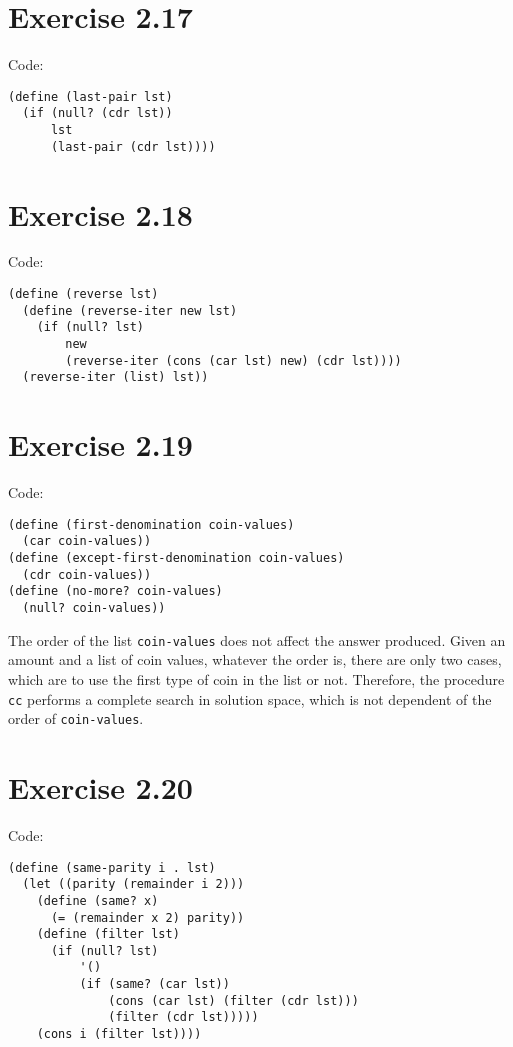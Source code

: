 \documentclass[../main.tex]{subfiles}
\begin{document}
\section{Exercise 2.17}

Code:

\begin{lstlisting}
(define (last-pair lst)
  (if (null? (cdr lst))
      lst
      (last-pair (cdr lst))))
\end{lstlisting}

\section{Exercise 2.18}

Code:

\begin{lstlisting}
(define (reverse lst)
  (define (reverse-iter new lst)
    (if (null? lst)
        new
        (reverse-iter (cons (car lst) new) (cdr lst))))
  (reverse-iter (list) lst))
\end{lstlisting}

\section{Exercise 2.19}

Code:

\begin{lstlisting}
(define (first-denomination coin-values)
  (car coin-values))
(define (except-first-denomination coin-values)
  (cdr coin-values))
(define (no-more? coin-values)
  (null? coin-values))
\end{lstlisting}

The order of the list \lstinline{coin-values} does not
 affect the answer produced. Given an amount and a
 list of coin values, whatever the order is, there are
 only two cases, which are to use the first type of coin
 in the list or not. Therefore, the procedure \lstinline{cc}
 performs a complete search in solution space, which
 is not dependent of the order of \lstinline{coin-values}.

\section{Exercise 2.20}

Code:

\begin{lstlisting}
(define (same-parity i . lst)
  (let ((parity (remainder i 2)))
    (define (same? x)
      (= (remainder x 2) parity))
    (define (filter lst)
      (if (null? lst)
          '()
          (if (same? (car lst))
              (cons (car lst) (filter (cdr lst)))
              (filter (cdr lst)))))
    (cons i (filter lst))))
\end{lstlisting}
\end{document}
